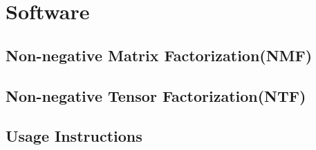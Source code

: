 \section{Software}

\subsection{Non-negative Matrix Factorization(NMF)}

\subsection{Non-negative Tensor Factorization(NTF)}

\subsection{Usage Instructions}